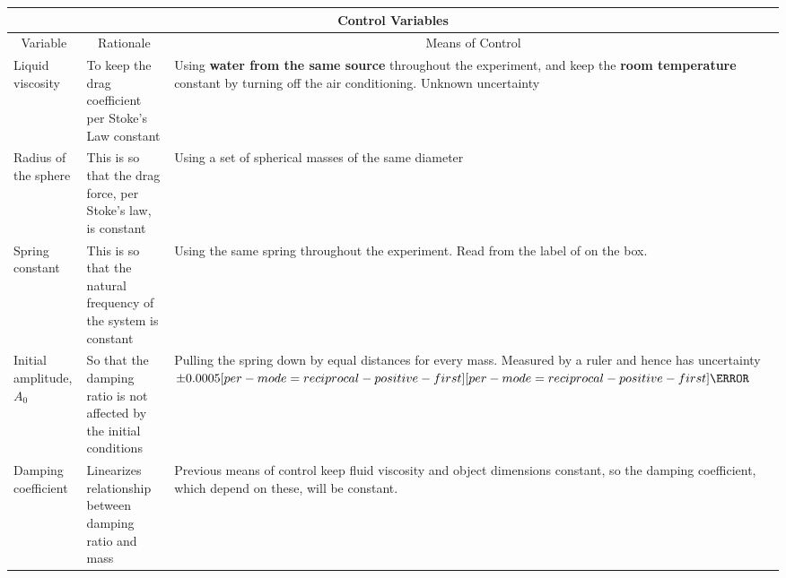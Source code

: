 \documentclass[a4paper,12pt]{article}
\let\oldsi\si
\renewcommand{\si}[1]{\oldsi[per-mode=reciprocal-positive-first]{#1}}
\newcommand{\thcolor}{\cellcolor{Blue!25}}
\begin{document}
\begin{center}
  \begin{tabular}{|p{}|p{}|p{}|}

    \hline
    \multicolumn{3}{|c|}{\thcolor Control Variables}                                                                                                                                                                                                                                     \\ \hline
    \multicolumn{1}{|c|}{Variable} & \multicolumn{1}{|c|}{Rationale}                                     & \multicolumn{1}{|c|}{Means of Control}                                                                                                                                        \\ \hline
    Liquid viscosity               & To keep the drag coefficient per Stoke's Law constant               & Using \textbf{water from the same source} throughout the experiment, and keep the \textbf{room temperature} constant by turning off the air conditioning. Unknown uncertainty \\ \hline
    Radius of the sphere           & This is so that the drag force, per Stoke's law, is constant        & Using a set of spherical masses of the same diameter                                                                                                                          \\ \hline
    Spring constant                & This is so that the natural frequency of the system is constant     & Using the same spring throughout the experiment. Read from the label of on the box.                                                                                           \\ \hline
    Initial amplitude, $A_0$       & So that the damping ratio is not affected by the initial conditions & Pulling the spring down by equal distances for every mass.  Measured by a ruler and hence has uncertainty $\pm 0.0005\si{\m}$                                                 \\ \hline
    Damping coefficient            & Linearizes relationship between damping ratio and mass              & Previous means of control keep fluid viscosity and object dimensions constant, so the damping coefficient, which depend on these, will be constant.                           \\
    \hline
  \end{tabular}
  \label{tab:2}
\end{center}
\end{document}
